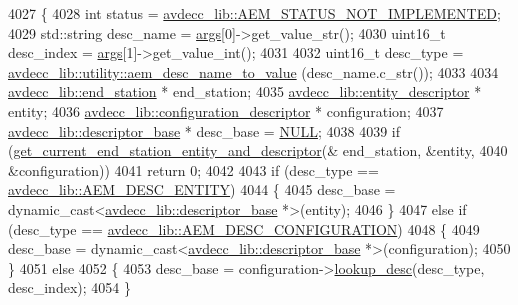 \begin{DoxyCode}
4027 \{
4028     \textcolor{keywordtype}{int} status = \hyperlink{namespaceavdecc__lib_affd436edb2cecd20cfd784a84f852b2ba1de0a38d458af43bc8965b715fd37b4f}{avdecc\_lib::AEM\_STATUS\_NOT\_IMPLEMENTED};
4029     std::string desc\_name = \hyperlink{namespaceastime__fitline_a8187411843a6284ffb964ef3fb9fcab3}{args}[0]->get\_value\_str();
4030     uint16\_t desc\_index = \hyperlink{namespaceastime__fitline_a8187411843a6284ffb964ef3fb9fcab3}{args}[1]->get\_value\_int();
4031 
4032     uint16\_t desc\_type = \hyperlink{namespaceavdecc__lib_1_1utility_a9f6076e32fa227555a95b6e95ea1e29b}{avdecc\_lib::utility::aem\_desc\_name\_to\_value}
      (desc\_name.c\_str());
4033 
4034     \hyperlink{classavdecc__lib_1_1end__station}{avdecc\_lib::end\_station} * end\_station;
4035     \hyperlink{classavdecc__lib_1_1entity__descriptor}{avdecc\_lib::entity\_descriptor} * entity;
4036     \hyperlink{classavdecc__lib_1_1configuration__descriptor}{avdecc\_lib::configuration\_descriptor} * configuration;
4037     \hyperlink{classavdecc__lib_1_1descriptor__base}{avdecc\_lib::descriptor\_base} * desc\_base = \hyperlink{openavb__types__base__pub_8h_a070d2ce7b6bb7e5c05602aa8c308d0c4}{NULL};
4038 
4039     \textcolor{keywordflow}{if} (\hyperlink{classcmd__line_ac2d4611fba7db03d436a2e3c1e64828e}{get\_current\_end\_station\_entity\_and\_descriptor}(&
      end\_station, &entity,
4040                                                       &configuration))
4041         \textcolor{keywordflow}{return} 0;
4042 
4043     \textcolor{keywordflow}{if} (desc\_type == \hyperlink{namespaceavdecc__lib_ac7b7d227e46bc72b63ee9e9aae15902fac9ebb31a55e5894637f6c3c710ceceaf}{avdecc\_lib::AEM\_DESC\_ENTITY})
4044     \{
4045         desc\_base = \textcolor{keyword}{dynamic\_cast<}\hyperlink{classavdecc__lib_1_1descriptor__base}{avdecc\_lib::descriptor\_base} *\textcolor{keyword}{>}(entity);
4046     \}
4047     \textcolor{keywordflow}{else} \textcolor{keywordflow}{if} (desc\_type == \hyperlink{namespaceavdecc__lib_ac7b7d227e46bc72b63ee9e9aae15902fab391827cda146b0d4199adf80f47117a}{avdecc\_lib::AEM\_DESC\_CONFIGURATION})
4048     \{
4049         desc\_base = \textcolor{keyword}{dynamic\_cast<}\hyperlink{classavdecc__lib_1_1descriptor__base}{avdecc\_lib::descriptor\_base} *\textcolor{keyword}{>}(configuration);
4050     \}
4051     \textcolor{keywordflow}{else}
4052     \{
4053         desc\_base = configuration->\hyperlink{classavdecc__lib_1_1configuration__descriptor_a21110c55f9064bbae432ae984106bb26}{lookup\_desc}(desc\_type, desc\_index);
4054     \}

\end{DoxyCode}
